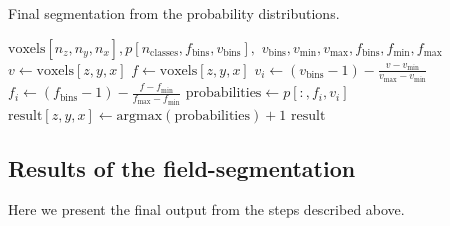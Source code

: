 \begin{algorithm}
    \caption{Final segmentation from the probability distributions.}
    \label{alg:segment}
    \begin{algorithmic}
         {$\text{voxels}[n_z,n_y,n_x], p[n_\text{classes},f_\text{bins},v_\text{bins}],$ \newline \indent \indent $v_\text{bins}, v_\text{min}, v_\text{max}, f_\text{bins}, f_\text{min}, f_\text{max}$}
                \State $v \gets \text{voxels}[z,y,x]$
                    \State $f \gets \text{voxels}[z,y,x]$
                        \State $v_i \gets (v_\text{bins} - 1) - \frac{v - v_\text{min}}{v_\text{max} - v_\text{min}}$
                        \State $f_i \gets (f_\text{bins} - 1) - \frac{f - f_\text{min}}{f_\text{max} - f_\text{min}}$
                        \State $\text{probabilities} \gets p[:,f_i,v_i]$
                        \State $\text{result}[z,y,x] \gets \text{argmax}(\text{probabilities}) + 1$
                    \EndIf
                \EndIf
            \EndFor
            \State \Return $\text{result}$
        \EndFunction
    \end{algorithmic}
\end{algorithm}

\subsection{Results of the field-segmentation}

Here we present the final output from the steps described above.

